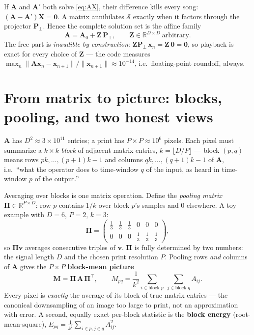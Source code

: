 \documentclass[11pt]{article}
\newcommand{\mA}{\bm{A}}
\newcommand{\mAo}{\bm{A}_0}
\newcommand{\mX}{\bm{X}}
\newcommand{\mPp}{\bm{P}_{\!\perp}}
\newcommand{\mZ}{\bm{Z}}
\newcommand{\mM}{\bm{M}}
\newcommand{\pool}{\bm{\Pi}}
\newcommand{\vx}{\bm{x}}
\newcommand{\vv}{\bm{v}}
\newcommand{\R}{\mathbb{R}}
\newcommand{\norm}[1]{\lVert #1 \rVert}
\begin{document}
If $\mA$ and $\mA'$ both solve \eqref{eq:AX}, their difference kills every
song: $(\mA-\mA')\mX = \bm{0}$. A matrix annihilates $\mathcal S$ exactly
when it factors through the projector $\mPp$. Hence the complete solution
set is the affine family
\begin{equation}
  \boxed{\ \mA = \mAo + \mZ\,\mPp,
  \qquad \mZ \in \R^{D\times D} \ \text{arbitrary.}\ }
  \label{eq:family}
\end{equation}
The free part is \emph{inaudible by construction}:
$\mZ\mPp\,\vx_n = \mZ\,\bm 0 = \bm 0$, so playback is exact for every
choice of $\mZ$ --- the code measures
$\max_n \norm{\mA\vx_n - \vx_{n+1}}/\norm{\vx_{n+1}} \approx 10^{-14}$,
i.e.\ floating-point roundoff, always.

\section{From matrix to picture: blocks, pooling, and two honest views}

$\mA$ has $D^2 \approx 3\times10^{11}$ entries; a print has
$P\times P \approx 10^6$ pixels. Each pixel must summarize a $k\times k$
\emph{block} of adjacent matrix entries, $k = \lfloor D/P\rfloor$ --- block
$(p,q)$ means rows $pk,\dots,(p{+}1)k-1$ and columns $qk,\dots,(q{+}1)k-1$
of $\mA$, i.e.\ ``what the operator does to time-window $q$ of the input,
as heard in time-window $p$ of the output.''

Averaging over blocks is one matrix operation. Define the \emph{pooling
matrix} $\pool \in \R^{P\times D}$: row $p$ contains $1/k$ over block $p$'s
samples and $0$ elsewhere. A toy example with $D=6$, $P=2$, $k=3$:
\begin{equation}
  \pool = \begin{pmatrix}
   \tfrac13 & \tfrac13 & \tfrac13 & 0 & 0 & 0\\[2pt]
   0 & 0 & 0 & \tfrac13 & \tfrac13 & \tfrac13
  \end{pmatrix},
\end{equation}
so $\pool\vv$ averages consecutive triples of $\vv$. $\pool$ is fully
determined by two numbers: the signal length $D$ and the chosen print
resolution $P$. Pooling rows \emph{and} columns of $\mA$ gives the
$P \times P$ \textbf{block-mean picture}
\begin{equation}
  \mM = \pool\,\mA\,\pool^\top,
  \qquad
  M_{pq} = \frac{1}{k^2}\!\!\sum_{i \in \text{block } p}\
  \sum_{j \in \text{block } q}\!\! A_{ij}.
  \label{eq:mean}
\end{equation}
Every pixel is \emph{exactly} the average of its block of true matrix
entries --- the canonical downsampling of an image too large to print, not
an approximation with error. A second, equally exact per-block statistic is
the \textbf{block energy} (root-mean-square),
$E_{pq} = \frac1{k^2}\sum_{i\in p, j\in q} A_{ij}^2$.
\end{document}
